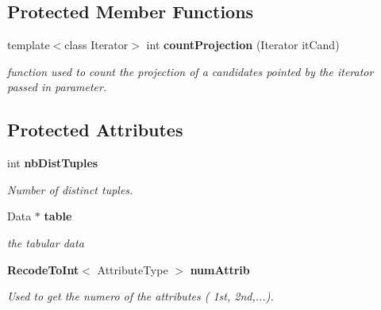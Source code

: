 \subsection*{Protected Member Functions}
\begin{CompactItemize}
\item 
template$<$class Iterator$>$ int {\bf count\-Projection} (Iterator it\-Cand)
\begin{CompactList}\small\item\em function used to count the projection of a candidates pointed by the iterator passed in parameter. \item\end{CompactList}\end{CompactItemize}
\subsection*{Protected Attributes}
\begin{CompactItemize}
\item 
int {\bf nb\-Dist\-Tuples}\label{class_key__base_e39c979bb73d9984029b18619e7edeb1}

\begin{CompactList}\small\item\em Number of distinct tuples. \item\end{CompactList}\item 
Data $\ast$ {\bf table}\label{class_key__base_c49571273cb2ae96f540733fdfe05f4d}

\begin{CompactList}\small\item\em the tabular data \item\end{CompactList}\item 
{\bf Recode\-To\-Int}$<$ Attribute\-Type $>$ {\bf num\-Attrib}\label{class_key__base_ed8fae06f994b73f9f9f3eb1ebbac690}

\begin{CompactList}\small\item\em Used to get the numero of the attributes ( 1st, 2nd,...). \item\end{CompactList}\end{CompactItemize}
